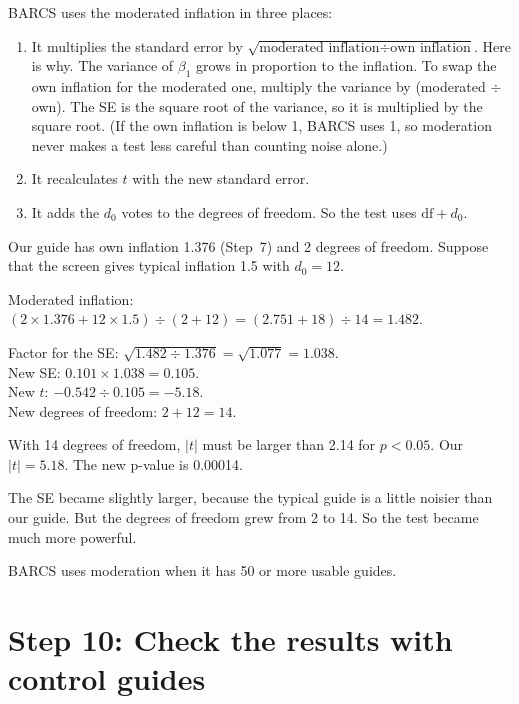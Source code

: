 BARCS uses the moderated inflation in three places:
\begin{enumerate}
\item It multiplies the standard error by
  $\sqrt{\text{moderated inflation} \div \text{own inflation}}$. Here is
  why. The variance of $\beta_1$ grows in proportion to the inflation. To
  swap the own inflation for the moderated one, multiply the variance by
  (moderated $\div$ own). The SE is the square root of the variance, so it
  is multiplied by the square root. (If the own inflation is below 1, BARCS
  uses 1, so moderation never makes a test less careful than counting noise
  alone.)
\item It recalculates $t$ with the new standard error.
\item It adds the $d_0$ votes to the degrees of freedom. So the test uses
  $\text{df} + d_0$.
\end{enumerate}

\begin{worked}
Our guide has own inflation 1.376 (Step~7) and 2 degrees of freedom.
Suppose that the screen gives typical inflation 1.5 with $d_0 = 12$.

Moderated inflation: $(2 \times 1.376 + 12 \times 1.5) \div (2 + 12)
 = (2.751 + 18) \div 14 = 1.482$.

Factor for the SE: $\sqrt{1.482 \div 1.376} = \sqrt{1.077} = 1.038$.\\
New SE: $0.101 \times 1.038 = 0.105$.\\
New $t$: $-0.542 \div 0.105 = -5.18$.\\
New degrees of freedom: $2 + 12 = 14$.

With 14 degrees of freedom, $|t|$ must be larger than 2.14 for
$p < 0.05$. Our $|t| = 5.18$. The new p-value is 0.00014.

The SE became slightly larger, because the typical guide is a little noisier
than our guide. But the degrees of freedom grew from 2 to 14. So the test
became much more powerful.
\end{worked}

BARCS uses moderation when it has 50 or more usable guides.
\section{Step 10: Check the results with control guides}

